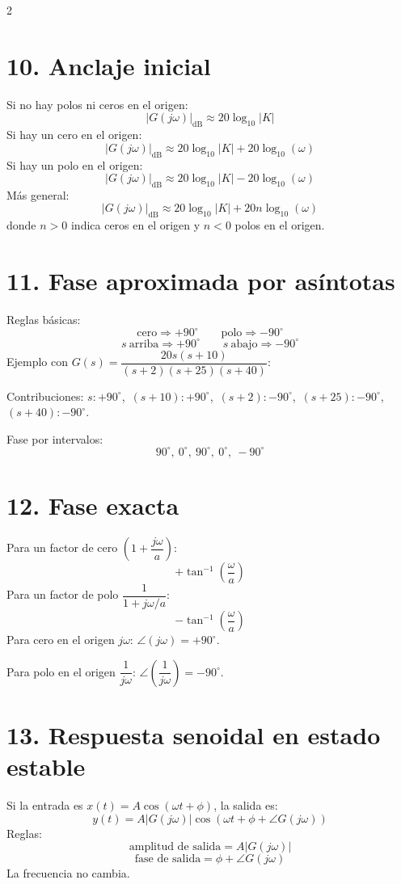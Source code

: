 \documentclass[11pt]{article}
\begin{document}
\begin{multicols}{2}
\section*{10. Anclaje inicial}

Si no hay polos ni ceros en el origen:
\[
|G(j\omega)|_{\mathrm{dB}}\approx 20\log_{10}|K|
\]
Si hay un cero en el origen:
\[
|G(j\omega)|_{\mathrm{dB}}\approx 20\log_{10}|K|+20\log_{10}(\omega)
\]
Si hay un polo en el origen:
\[
|G(j\omega)|_{\mathrm{dB}}\approx 20\log_{10}|K|-20\log_{10}(\omega)
\]
Más general:
\[
|G(j\omega)|_{\mathrm{dB}}\approx 20\log_{10}|K|+20n\log_{10}(\omega)
\]
donde $n>0$ indica ceros en el origen y $n<0$ polos en el origen.

\section*{11. Fase aproximada por asíntotas}

Reglas básicas:
\[
\text{cero} \Rightarrow +90^\circ \qquad \text{polo} \Rightarrow -90^\circ
\]
\[
s\ \text{arriba} \Rightarrow +90^\circ \qquad s\ \text{abajo} \Rightarrow -90^\circ
\]
Ejemplo con $G(s)=\dfrac{20s(s+10)}{(s+2)(s+25)(s+40)}$:

Contribuciones: $s\!:+90^\circ$,\ $(s+10)\!:+90^\circ$,\ $(s+2)\!:-90^\circ$,\ $(s+25)\!:-90^\circ$,\ $(s+40)\!:-90^\circ$.

Fase por intervalos:
\[
90^\circ,\ 0^\circ,\ 90^\circ,\ 0^\circ,\ -90^\circ
\]

\section*{12. Fase exacta}

Para un factor de cero $\left(1+\dfrac{j\omega}{a}\right)$:
\[
+\tan^{-1}\!\left(\frac{\omega}{a}\right)
\]
Para un factor de polo $\dfrac{1}{1+j\omega/a}$:
\[
-\tan^{-1}\!\left(\frac{\omega}{a}\right)
\]
Para cero en el origen $j\omega$: $\angle(j\omega)=+90^\circ$.

Para polo en el origen $\dfrac{1}{j\omega}$: $\angle\!\left(\dfrac{1}{j\omega}\right)=-90^\circ$.

\section*{13. Respuesta senoidal en estado estable}

Si la entrada es $x(t)=A\cos(\omega t+\phi)$, la salida es:
\[
y(t)=A|G(j\omega)|\cos\!\left(\omega t+\phi+\angle G(j\omega)\right)
\]
Reglas:
\[
\text{amplitud de salida}=A|G(j\omega)|
\]
\[
\text{fase de salida}=\phi+\angle G(j\omega)
\]
La frecuencia no cambia.


\end{multicols}
\end{document}
